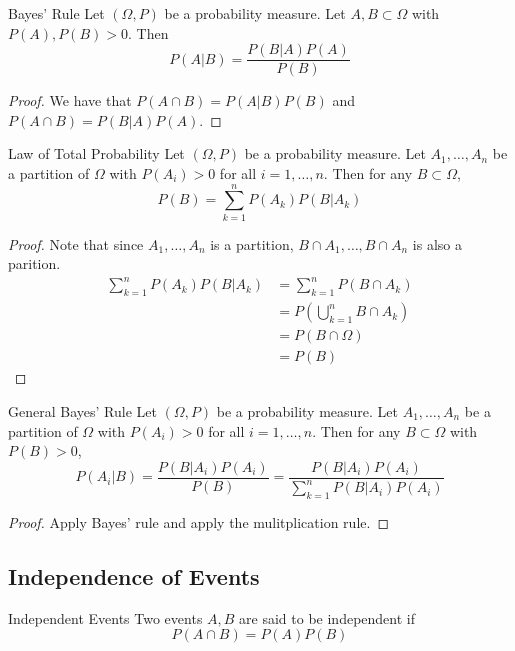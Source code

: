 \documentclass[a4paper]{article}
\begin{document}
\begin{thm}{Bayes' Rule}{} Let $(\Omega,P)$ be a probability measure. Let $A,B\subset\Omega$ with $P(A),P(B)>0$. Then $$P(A|B)=\frac{P(B|A)P(A)}{P(B)}$$
\end{thm}
\begin{proof} We have that $P(A\cap B)=P(A|B)P(B)$ and $P(A\cap B)=P(B|A)P(A)$. 
\end{proof}

\begin{thm}{Law of Total Probability}{} Let $(\Omega,P)$ be a probability measure. Let $A_1,\dots,A_n$ be a partition of $\Omega$ with $P(A_i)>0$ for all $i=1,\dots,n$. Then for any $B\subset\Omega$, $$P(B)=\sum_{k=1}^nP(A_k)P(B|A_k)$$
\end{thm}
\begin{proof} Note that since $A_1,\dots,A_n$ is a partition, $B\cap A_1,\dots,B\cap A_n$ is also a parition. 
\begin{align*}
\sum_{k=1}^nP(A_k)P(B|A_k)&=\sum_{k=1}^nP(B\cap A_k)\\
&=P\left(\bigcup_{k=1}^nB\cap A_k\right)\\
&=P(B\cap\Omega)\\
&=P(B)
\end{align*}
\end{proof}

\begin{thm}{General Bayes' Rule}{} Let $(\Omega,P)$ be a probability measure. Let $A_1,\dots,A_n$ be a partition of $\Omega$ with $P(A_i)>0$ for all $i=1,\dots,n$. Then for any $B\subset\Omega$ with $P(B)>0$, $$P(A_i|B)=\frac{P(B|A_i)P(A_i)}{P(B)}=\frac{P(B|A_i)P(A_i)}{\sum_{k=1}^nP(B|A_i)P(A_i)}$$
\end{thm}
\begin{proof} Apply Bayes' rule and apply the mulitplication rule. 
\end{proof}

\subsection{Independence of Events}
\begin{defn}{Independent Events}{} Two events $A,B$ are said to be independent if $$P(A\cap B)=P(A)P(B)$$
\end{defn}
\end{document}
